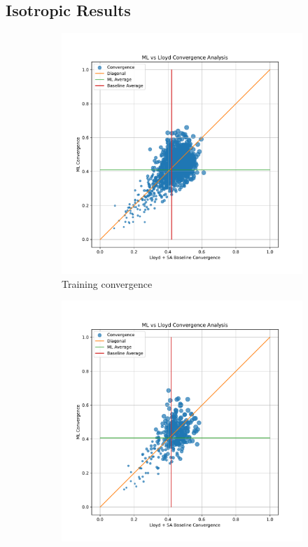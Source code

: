 \documentclass{article}
\begin{document}
\subsection{Isotropic Results}

\begin{figure}[h]
  \centering
  \begin{subfigure}[t]{0.49\textwidth}
    \centering
    \includegraphics[width=\textwidth]{iso_train_convergence.pdf}
    \caption{Training convergence}
  \end{subfigure}
  \begin{subfigure}[t]{0.49\textwidth}
    \centering
    \includegraphics[width=\textwidth]{iso_test_convergence.pdf}

\end{subfigure}
\end{figure}
\end{document}
